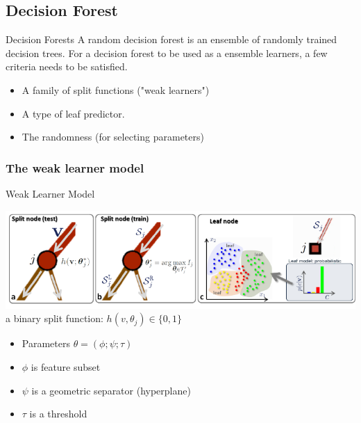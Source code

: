\documentclass[11pt,aspectratio=1610,usenames,dvipsnames]{beamer} %
\begin{document}
\subsection{Decision Forest}%
\begin{frame}{Decision Forests}%
	A random decision forest is an ensemble of randomly trained decision trees. For a decision forest to be used as a ensemble learners, a few criteria needs to be satisfied.
	\begin{itemize}%
		\item A family of split functions ("weak learners")
		\item A type of leaf predictor.
		\item The randomness (for selecting parameters)
	\end{itemize}%
\end{frame}%


\subsubsection{The weak learner model}
\begin{frame}{Weak Learner Model}

	\includegraphics[scale = 0.90]{figures/decisionForests-5.pdf}
	a binary split function: $ h(v, \theta_{j}) \in \{0,1\} $
	\begin{itemize}
		\item Parameters $ \theta = (\phi;\psi ;\tau) $
		\item $ \phi $ is feature subset
		\item $ \psi $ is a geometric separator (hyperplane)
		\item $ \tau $ is a threshold
	\end{itemize}
\end{frame}
\end{document}
